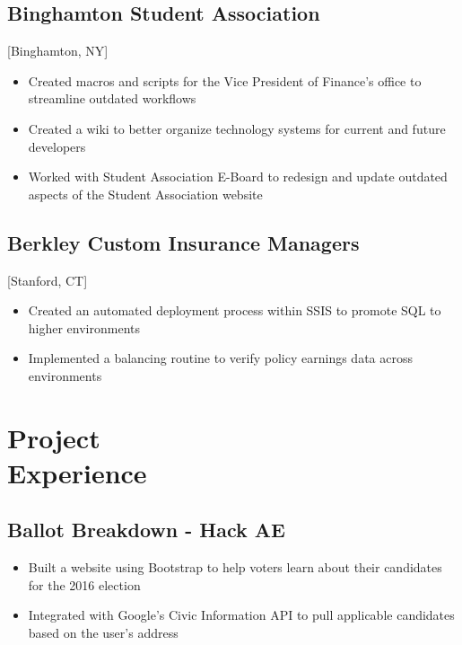 \documentclass{mycv}
\begin{document}
\subsection{Binghamton Student Association}[Binghamton, NY]
\begin{positions}
\end{positions}

\begin{itemize}
  \item Created macros and scripts for the Vice President of Finance's office to streamline outdated workflows
  \item Created a wiki to better organize technology systems for current and future developers
  \item Worked with Student Association E-Board to redesign and update outdated aspects of the Student Association website
\end{itemize}

\subsection{Berkley Custom Insurance Managers}[Stanford, CT]
\begin{positions}
\end{positions}

\begin{itemize}
  \item Created an automated deployment process within SSIS to promote SQL to higher environments
  \item Implemented a balancing routine to verify policy earnings data across environments
\end{itemize}

\section{Project  \\ Experience}
\subsection{Ballot Breakdown - Hack AE}
\begin{itemize}
  \item Built a website using Bootstrap to help voters learn about their candidates for the 2016 election
  \item Integrated with Google's Civic Information API to pull applicable candidates based on the user's address
\end{itemize}
\end{document}
